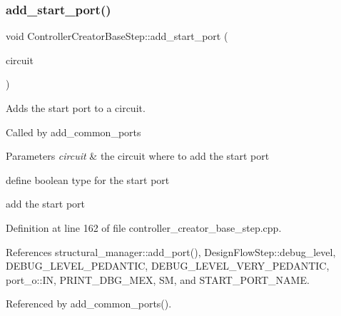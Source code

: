 \subsubsection{\texorpdfstring{add\+\_\+start\+\_\+port()}{add\_start\_port()}}
{\footnotesize\ttfamily void Controller\+Creator\+Base\+Step\+::add\+\_\+start\+\_\+port (\begin{DoxyParamCaption}\item[{\hyperlink{structural__objects_8hpp_a8ea5f8cc50ab8f4c31e2751074ff60b2}{structural\+\_\+object\+Ref}}]{circuit }\end{DoxyParamCaption})\hspace{0.3cm}{\ttfamily [private]}}



Adds the start port to a circuit. 

Called by add\+\_\+common\+\_\+ports 
\begin{DoxyParams}{Parameters}
{\em circuit} & the circuit where to add the start port \\
\hline
\end{DoxyParams}
define boolean type for the start port

add the start port 

Definition at line 162 of file controller\+\_\+creator\+\_\+base\+\_\+step.\+cpp.



References structural\+\_\+manager\+::add\+\_\+port(), Design\+Flow\+Step\+::debug\+\_\+level, D\+E\+B\+U\+G\+\_\+\+L\+E\+V\+E\+L\+\_\+\+P\+E\+D\+A\+N\+T\+IC, D\+E\+B\+U\+G\+\_\+\+L\+E\+V\+E\+L\+\_\+\+V\+E\+R\+Y\+\_\+\+P\+E\+D\+A\+N\+T\+IC, port\+\_\+o\+::\+IN, P\+R\+I\+N\+T\+\_\+\+D\+B\+G\+\_\+\+M\+EX, SM, and S\+T\+A\+R\+T\+\_\+\+P\+O\+R\+T\+\_\+\+N\+A\+ME.



Referenced by add\+\_\+common\+\_\+ports().

